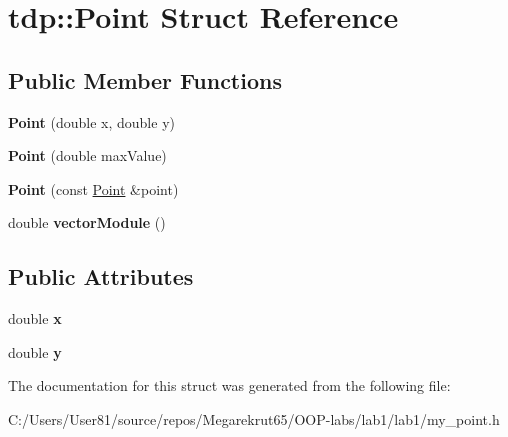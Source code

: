 \hypertarget{structtdp_1_1_point}{}\section{tdp\+:\+:Point Struct Reference}
\label{structtdp_1_1_point}
\subsection*{Public Member Functions}
\begin{DoxyCompactItemize}
\item 
\mbox{\label{structtdp_1_1_point_ab713435b69e5d6cfe3704739cf2eef1e}} 
{\bfseries Point} (double x, double y)
\item 
\mbox{\label{structtdp_1_1_point_a37a23b239ed2dcc7b803fb851b1c4c11}} 
{\bfseries Point} (double max\+Value)
\item 
\mbox{\label{structtdp_1_1_point_af13c65c1b6d9a0cd1d5360eb29c8e1ce}} 
{\bfseries Point} (const \mbox{\hyperlink{structtdp_1_1_point}{Point}} \&point)
\item 
\mbox{\label{structtdp_1_1_point_a66681cb3fb742ab9dbe355c0784b8242}} 
double {\bfseries vector\+Module} ()
\end{DoxyCompactItemize}
\subsection*{Public Attributes}
\begin{DoxyCompactItemize}
\item 
\mbox{\label{structtdp_1_1_point_a31898184708346947177896af4c7eac6}} 
double {\bfseries x}
\item 
\mbox{\label{structtdp_1_1_point_af46e9a346f374660a675336c2e619a69}} 
double {\bfseries y}
\end{DoxyCompactItemize}


The documentation for this struct was generated from the following file\+:\begin{DoxyCompactItemize}
\item 
C\+:/\+Users/\+User81/source/repos/\+Megarekrut65/\+O\+O\+P-\/labs/lab1/lab1/my\+\_\+point.\+h\end{DoxyCompactItemize}
